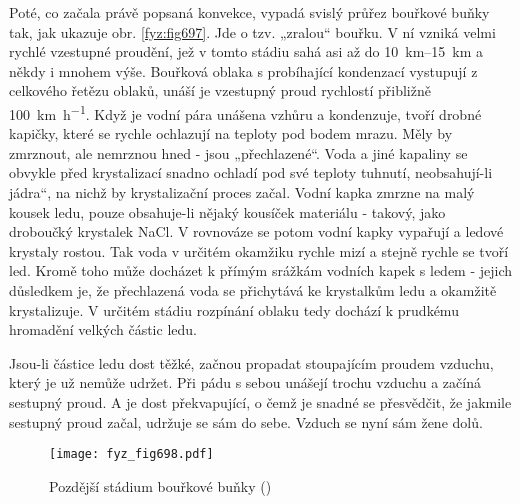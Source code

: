     Poté, co začala právě popsaná konvekce, vypadá svislý průřez bouřkové buňky tak, jak ukazuje
    obr. \ref{fyz:fig697}. Jde o tzv. „zralou“ bouřku. V ní vzniká velmi rychlé vzestupné proudění,
    jež v tomto stádiu sahá asi až do \SIrange{10}{15}{\km} a někdy i mnohem výše. Bouřková oblaka s
    probíhající kondenzací vystupují z celkového řetězu oblaků, unáší je vzestupný proud rychlostí
    přibližně \SI{100}{\km\per\hour}. Když je vodní pára unášena vzhůru a kondenzuje, tvoří drobné
    kapičky, které se rychle ochlazují na teploty pod bodem mrazu. Měly by zmrznout, ale nemrznou
    hned - jsou „přechlazené“. Voda a jiné kapaliny se obvykle před krystalizací snadno ochladí pod
    své teploty tuhnutí, neobsahují-li jádra“, na nichž by krystalizační proces začal. Vodní kapka
    zmrzne na malý kousek ledu, pouze obsahuje-li nějaký kousíček materiálu - takový, jako droboučký
    krystalek NaCl. V rovnováze se potom vodní kapky vypařují a ledové krystaly rostou. Tak voda v
    určitém okamžiku rychle mizí a stejně rychle se tvoří led. Kromě toho může docházet k přímým
    srážkám vodních kapek s ledem - jejich důsledkem je, že přechlazená voda se přichytává ke
    krystalkům ledu a okamžitě krystalizuje. V určitém stádiu rozpínání oblaku tedy dochází k
    prudkému hromadění velkých částic ledu.

    Jsou-li částice ledu dost těžké, začnou propadat stoupajícím proudem vzduchu, který je už nemůže
    udržet. Při pádu s sebou unášejí trochu vzduchu a začíná sestupný proud. A je dost překvapující,
    o čemž je snadné se přesvědčit, že jakmile sestupný proud začal, udržuje se sám do sebe. Vzduch
    se nyní sám žene dolů.

    \begin{figure}[ht!] %
      \centering
      \texttt{[image: fyz\_fig698.pdf]}
      \caption{Pozdější stádium bouřkové buňky (\cite[s.~707]{Feynman02})}
      \label{fyz:fig698}
    \end{figure}

